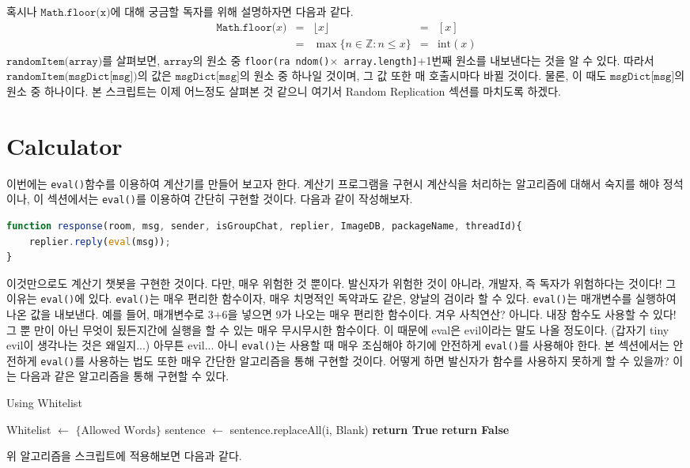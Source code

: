 \documentclass[10pt,b6paper,final]{book}
\begin{document}
혹시나 $\texttt{Math.floor(x)}$에 대해 궁금할 독자를 위해 설명하자면 다음과 같다.
\[
\begin{matrix}
\texttt{Math.floor(}x\texttt{)} &=& \lfloor x\rfloor &=& [x]\\
       &=& \max\{n\in \mathbb {Z} \colon n\leq x\} &=& \text{int}(x)
\end{matrix}
\]
$\texttt{randomItem(array)}$를 살펴보면, $\texttt{array}$의 원소 중 \texttt{floor(ra ndom()$\times$ array.length]}+1번째 원소를
내보낸다는 것을 알 수 있다. 따라서 $\texttt{randomItem(msgDict[msg])}$의 값은 $\texttt{msgDict[msg]}$의 원소 중
하나일 것이며, 그 값 또한 매 호출시마다 바뀔 것이다. 물론, 이 때도 $\texttt{msgDict[msg]}$의 원소 중 하나이다. 본 스크립트는 이제
어느정도 살펴본 것 같으니 여기서 Random Replication 섹션를 마치도록 하겠다.

\section{Calculator}
이번에는 \texttt{eval()}함수를 이용하여 계산기를 만들어 보고자 한다. 계산기 프로그램을 구현시 계산식을 처리하는 알고리즘에 대해서
숙지를 해야 정석이나, 이 섹션에서는 \texttt{eval()}를 이용하여 간단히 구현할 것이다. 다음과 같이 작성해보자.
\begin{lstlisting}[language=JavaScript,escapeinside=@@]
function response(room, msg, sender, isGroupChat, replier, ImageDB, packageName, threadId){
    replier.reply(eval(msg));
}
\end{lstlisting}
이것만으로도 계산기 챗봇을 구현한 것이다. 다만, 매우 위험한 것 뿐이다. 발신자가 위험한 것이 아니라,
개발자, 즉 독자가 위험하다는 것이다! 그 이유는 \texttt{eval()}에 있다. \texttt{eval()}는 매우 편리한 함수이자,
매우 치명적인 독약과도 같은, 양날의 검이라 할 수 있다.
\texttt{eval()}는 매개변수를 실행하여 나온 값을 내보낸다. 예를 들어, 매개변수로 3+6을 넣으면 9가 나오는 매우 편리한 함수이다.
겨우 사칙연산? 아니다. 내장 함수도 사용할 수 있다! 그 뿐 만이 아닌 무엇이 됬든지간에 실행을 할 수 있는 매우 무시무시한 함수이다.
이 때문에 eval은 evil이라는 말도 나올 정도이다. (갑자기 tiny evil이 생각나는 것은 왜일지...) 아무튼
evil... 아니 \texttt{eval()}는 사용할 때 매우 조심해야 하기에 안전하게 \texttt{eval()}를 사용해야 한다.
본 섹션에서는 안전하게 \texttt{eval()}를 사용하는 법도 또한 매우 간단한 알고리즘을 통해 구현할 것이다.
어떻게 하면 발신자가 함수를 사용하지 못하게 할 수 있을까? 이는 다음과 같은 알고리즘을 통해 구현할 수 있다.
\newpage
\begin{algorithm}
        \caption{Using Whitelist}\label{euclid}
        \begin{algorithmic}[1]
            \State Whitelist $\gets $ $\{\text{Allowed Words}\}$
                \State sentence $\gets$ sentence.replaceAll(i, Blank)
            \EndFor
            	\State \textbf{return True}
            \Else
            	\State \textbf{return False}
            \EndIf
            \EndProcedure
        \end{algorithmic}\end{algorithm}위 알고리즘을 스크립트에 적용해보면 다음과 같다.
\end{document}
